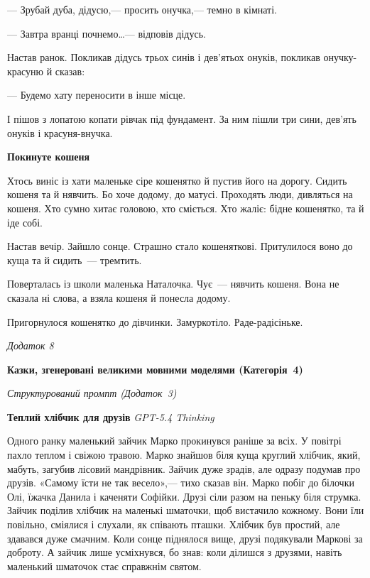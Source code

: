 \documentclass[14pt, a4paper]{extreport}
\begin{document}
--- Зрубай дуба, дідусю,--- просить онучка,--- темно в кімнаті.

--- Завтра вранці почнемо\ldots --- відповів дідусь.

Настав ранок. Покликав дідусь трьох синів і дев'ятьох онуків, покликав онучку-красуню й сказав:

--- Будемо хату переносити в інше місце.

І пішов з лопатою копати рівчак під фундамент. За ним пішли три сини, дев'ять онуків і красуня-внучка.

\vspace{14pt}
\textbf{Покинуте кошеня}

Хтось виніс із хати маленьке сіре кошенятко й пустив його на дорогу. Сидить кошеня та й нявчить. Бо хоче додому, до матусі. Проходять люди, дивляться на кошеня. Хто сумно хитає головою, хто сміється. Хто жаліє: бідне кошенятко, та й іде собі.

Настав вечір. Зайшло сонце. Страшно стало кошеняткові. Притулилося воно до куща та й сидить~--- тремтить.

Поверталась із школи маленька Наталочка. Чує~--- нявчить кошеня. Вона не сказала ні слова, а взяла кошеня й понесла додому.

Пригорнулося кошенятко до дівчинки. Замуркотіло. Раде-радісіньке.

\newpage
\begin{flushright}\textit{Додаток 8}\end{flushright}
\begin{center}\textbf{Казки, згенеровані великими мовними моделями (Категорія~4)}\end{center}
\vspace{0.3cm}

\begin{center}\textit{Структурований промпт (Додаток~3)}\end{center}
\vspace{6pt}

\textbf{Теплий хлібчик для друзів} \hfill\textit{GPT-5.4 Thinking}

\medskip
Одного ранку маленький зайчик Марко прокинувся раніше за всіх. У повітрі пахло теплом і свіжою травою. Марко знайшов біля куща круглий хлібчик, який, мабуть, загубив лісовий мандрівник. Зайчик дуже зрадів, але одразу подумав про друзів. «Самому їсти не так весело»,--- тихо сказав він. Марко побіг до білочки Олі, їжачка Данила і каченяти Софійки. Друзі сіли разом на пеньку біля струмка. Зайчик поділив хлібчик на маленькі шматочки, щоб вистачило кожному. Вони їли повільно, сміялися і слухали, як співають пташки. Хлібчик був простий, але здавався дуже смачним. Коли сонце піднялося вище, друзі подякували Маркові за доброту. А зайчик лише усміхнувся, бо знав: коли ділишся з друзями, навіть маленький шматочок стає справжнім святом.
\end{document}
